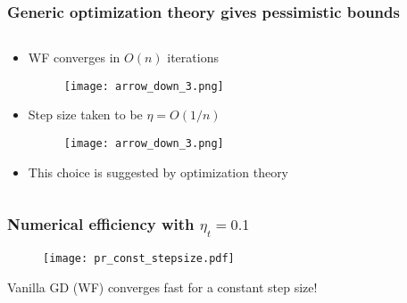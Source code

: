 \documentclass[compress,
mathserif,wide,%
]{beamer}
\begin{document}
\begin{frame}
	\frametitle{Generic optimization theory gives pessimistic bounds}

\begin{columns}

\begin{column}{0.92\textwidth}
\begin{itemize}
  \item[] WF converges in $O(n)$ iterations
  \pause

  \vspace{-1em}
  \begin{figure}
	\texttt{[image: arrow\_down\_3.png]} \qquad 
  \end{figure}

  \item[] Step size taken to be \alert{$\eta = O(1/n)$}

  \pause
  \vspace{-1em}
  \begin{figure}
	\texttt{[image: arrow\_down\_3.png]} \qquad 
  \end{figure}


  \item[] This choice is suggested by  optimization theory

  
\end{itemize}

\end{column}
\end{columns}

\end{frame}




\begin{frame}
	\frametitle{Numerical efficiency with $\eta_t  = 0.1$}
\begin{figure}
	\centering
	\texttt{[image: pr\_const\_stepsize.pdf]}
\end{figure}

{

\begin{varblock}[\textwidth]{}
\begin{center}
  	Vanilla GD (WF) converges fast for a constant step size! 
\end{center}
\end{varblock}
}


\end{frame}
\end{document}
